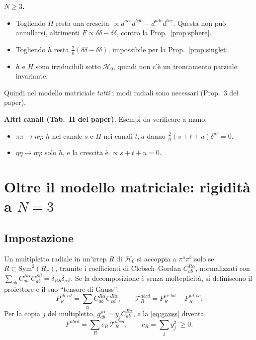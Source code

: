 \documentclass[11pt,a4paper]{article}
\numberwithin{equation}{section}
\theoremstyle{remark}
\newcommand{\Hg}{\mathcal{H}_0}
\begin{document}
\textbf{$N\ge3$.}
\begin{itemize}
\item Togliendo $H$ resta una crescita $\propto d^{ace}d^{bde}-d^{ade}d^{bce}$. Questa non può annullarsi, altrimenti $F\propto\delta\delta-\delta\delta$, contro la Prop.~\ref{prop:sphere}.
\item Togliendo $h$ resta $\frac2n(\delta\delta-\delta\delta)$, impossibile per la Prop.~\ref{prop:singlet}.
\item $h$ e $H$ sono irriducibili sotto $\Hg$, quindi non c'è un troncamento parziale invariante.
\end{itemize}
Quindi nel modello matriciale \emph{tutti} i modi radiali sono necessari (Prop.~3 del paper).

\textbf{Altri canali (Tab.~II del paper).} Esempi da verificare a mano:
\begin{itemize}
\item $\pi\pi\to\eta\eta$: $h$ nel canale $s$ e $H$ nei canali $t,u$ danno $\frac2n(s+t+u)\delta^{ab}=0$.
\item $\eta\eta\to\eta\eta$: solo $h$, e la crescita è $\propto s+t+u=0$.
\end{itemize}

\section{Oltre il modello matriciale: rigidità a $N=3$}
\label{sec:rigidity}

\subsection{Impostazione}

Un multipletto radiale in un'irrep $R$ di $\Hg$ si accoppia a $\pi^a\pi^b$ solo se $R\subset\mathrm{Sym}^2(R_\pi)$, tramite i coefficienti di Clebsch--Gordan $C^{R\alpha}_{ab}$, normalizzati con $\sum_{ab}C^{R\alpha}_{ab}C^{S\beta}_{ab}=\delta_{RS}\delta_{\alpha\beta}$. Se la decomposizione è senza molteplicità, si definiscono il proiettore e il suo ``tensore di Gauss'':
\[
P_R^{ab,cd}=\sum_\alpha C^{R\alpha}_{ab}C^{R\alpha}_{cd},\qquad \mathcal T_R^{abcd}=P_R^{ac,bd}-P_R^{ad,bc}.
\]
Per la copia $j$ del multipletto, $g^{j\alpha}_{ab}=y_jC^{R\alpha}_{ab}$, e la \eqref{eq:gauss} diventa
\begin{equation}
F^{abcd}=\sum_Rc_R\,\mathcal T_R^{abcd},\qquad c_R=\sum_jy_j^2\ \ge0 .
\end{equation}
\end{document}
